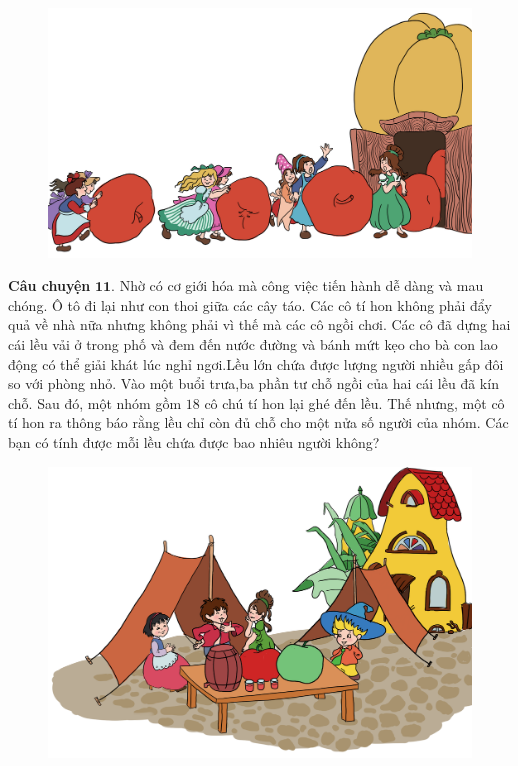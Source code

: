	\begin{figure}[H]
		\centering
		\vspace*{-5pt}
		\captionsetup{labelformat= empty, justification=centering}
		\includegraphics[width=0.6\linewidth]{Hinh12_ChuyenTao}
		\vspace*{-10pt}
	\end{figure}
	\textbf{\color{toancuabi}Câu chuyện} $\pmb{11.}$ Nhờ có cơ giới hóa mà công việc tiến hành dễ dàng và mau chóng. Ô tô đi lại như con thoi giữa các cây táo. Các cô tí hon không phải đẩy quả về nhà nữa nhưng không phải vì thế mà các cô ngồi chơi. Các cô đã dựng hai cái lều vải ở trong phố và đem đến nước đường và bánh mứt kẹo cho bà con lao động có thể giải khát lúc nghỉ ngơi.Lều lớn chứa được lượng người nhiều gấp đôi so với phòng nhỏ. Vào một buổi trưa,ba phần tư chỗ ngồi của hai cái lều đã kín chỗ. Sau đó, một nhóm gồm $18$ cô chú tí hon lại ghé đến lều. Thế nhưng, một cô tí hon ra thông báo rằng lều chỉ còn đủ chỗ cho một nửa số người của nhóm. Các bạn có tính được mỗi lều chứa được bao nhiêu người không?
		\begin{figure}[H]
		\centering
		\vspace*{-5pt}
		\captionsetup{labelformat= empty, justification=centering}
		\includegraphics[width=0.55\linewidth]{Hinh13_Leu}
		\vspace*{-10pt}
	\end{figure}
